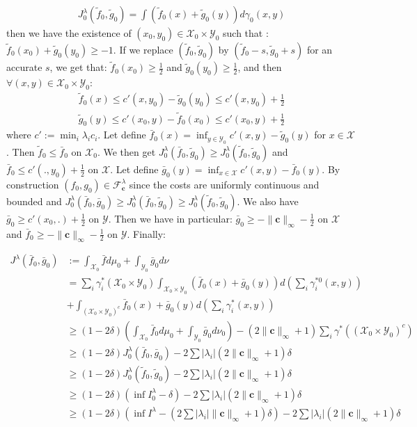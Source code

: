 \begin{prv*}
\begin{align*}
J_0^\lambda(\tilde{f}_0,\tilde{g}_0) = \int (\tilde{f}_0(x)+\tilde{g}_0(y))d\gamma_0(x,y)
\end{align*}
then we have the existence of $(x_0,y_0)\in\mathcal{X}_0\times\mathcal{Y}_0$ such that : $\tilde{f}_0(x_0)+\tilde{g}_0(y_0)\geq -1$. If we replace $(\tilde{f}_0,\tilde{g}_0)$ by $(\tilde{f}_0-s,\tilde{g}_0+s)$ for an accurate $s$, we get that: $\tilde{f}_0(x_0)\geq \frac12$
and $\tilde{g}_0(y_0)\geq \frac12$, and then $\forall(x,y)\in\mathcal{X}_0\times\mathcal{Y}_0$:
\begin{align*}
    \tilde{f}_0(x)\leq c'(x,y_0)-\tilde{g}_0(y_0)\leq c'(x,y_0)+\frac12\\
    \tilde{g}_0(y)\leq c'(x_0,y)-\tilde{f}_0(x_0)\leq c'(x_0,y)+\frac12
\end{align*}
where $c':=\min_i\lambda_ic_i$.  Let define $\bar{f}_0(x) = \inf_{y\in\mathcal{Y}_0}c'(x,y)-\tilde{g}_0(y)$ for $x\in\mathcal{X}$.  Then $\tilde{f}_0\leq \bar{f}_0$ on $\mathcal{X}_0$. We then get $J_0^\lambda(\bar{f}_0,\tilde{g}_0)\geq J_0^\lambda(\tilde{f}_0,\tilde{g}_0)$ and $\bar{f}_0\leq c'(.,y_0)+\frac12$ on $\mathcal{X}$. Let define $\bar{g}_0(y)= \inf_{x\in\mathcal{X}}c'(x,y)-\bar{f}_0(y)$. By construction $(f_0,g_0)\in \mathcal{F}
^\lambda_\mathbf{c}$ since the costs are uniformly continuous and bounded and $J_0^\lambda(\bar{f}_0,\bar{g}_0)\geq J_0^\lambda(\bar{f}_0,\tilde{g}_0)\geq J_0^\lambda(\tilde{f}_0,\tilde{g}_0)$. We also have  $\bar{g}_0\geq c'(x_0,.)+\frac12$ on $\mathcal{Y}$. Then we have in particular: $\bar{g}_0\geq -\lVert\mathbf{c}\rVert_\infty-\frac12$ on $\mathcal{X}$ and $\bar{f}_0\geq -\lVert\mathbf{c}\rVert_\infty-\frac12$ on $\mathcal{Y}$. Finally:

\begin{align*}
J^\lambda(\bar{f}_0,\bar{g}_0)&:=\int_{\mathcal{X}_0}\bar{f}d\mu_0+\int_{\mathcal{Y}_0}\bar{g}_0d\nu\\
&=\sum_i\gamma_i^*(\mathcal{X}_0\times\mathcal{Y}_0)\int_{\mathcal{X}_0\times\mathcal{Y}_0}(\bar{f}_0(x)+\bar{g}_0(y))d\left(\sum_i\gamma^{*0}_i(x,y)\right)\\
&+\int_{(\mathcal{X}_0\times\mathcal{Y}_0)^c}\bar{f}_0(x)+\bar{g}_0(y)d\left(\sum_i\gamma^{*}_i(x,y)\right)\\
&\geq (1-2\delta)\left(\int_{\mathcal{X}_0}\bar{f}_0d\mu_0+\int_{\mathcal{Y}_0}\bar{g}_0d\nu_0\right)-(2\lVert\mathbf{c}\rVert_\infty+1)\sum_i\gamma^*((\mathcal{X}_0\times\mathcal{Y}_0)^c)\\
&\geq (1-2\delta)J_0^\lambda(\bar{f}_0,\bar{g}_0)-2\sum |\lambda_i|(2\lVert\mathbf{c}\rVert_\infty+1)\delta\\
&\geq (1-2\delta)J_0^\lambda(\tilde{f}_0,\tilde{g}_0)-2\sum |\lambda_i|(2\lVert\mathbf{c}\rVert_\infty+1)\delta\\
&\geq (1-2\delta)(\inf I^\lambda_0-\delta)-2\sum |\lambda_i|(2\lVert\mathbf{c}\rVert_\infty+1)\delta\\
&\geq  (1-2\delta)(\inf I^\lambda-(2\sum |\lambda_i|\lVert\mathbf{c}\rVert_\infty+1)\delta)-2\sum |\lambda_i|(2\lVert\mathbf{c}\rVert_\infty+1)\delta
\end{align*}


\end{prv*}
